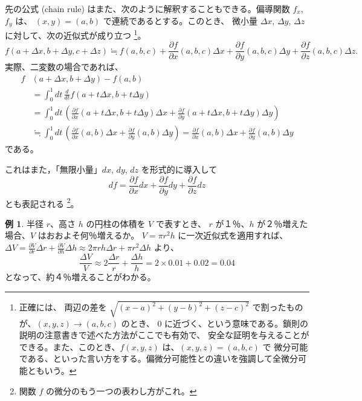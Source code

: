 \documentclass[a4paper]{jsarticle}
\theoremstyle{definition}
\newtheorem{Example}[Theorem]{例}
\theoremstyle{remark}
\newcommand{\del}{\partial}
\begin{document}
\bigskip
{}

先の公式 (chain rule) はまた、次のように解釈することもできる。偏導関数 $f_x$, $f_y$ は、
$(x,y) = (a,b)$ で連続であるとする。このとき、
微小量 $\Delta x$, $\Delta y$, $\Delta z$ に対して、次の近似式が成り立つ
\footnote{正確には、
両辺の差を $\sqrt{(x-a)^2+(y-b)^2+(z-c)^2}$ で割ったものが、$(x,y,z) \to (a,b,c)$ のとき、
$0$ に近づく、という意味である。鎖則の説明の注意書きで述べた方法がここでも有効で、
安全な証明を与えることができる。また、このとき、$f(x,y,z)$ は、$(x,y,z) = (a,b,c)$ で
微分可能である、といった言い方をする。偏微分可能性との違いを強調して全微分可能ともいう。
}。
\[
f(a+\Delta x,b+\Delta y,c+\Delta z) \fallingdotseq f(a,b,c) 
+ \frac{\del f}{\del x}(a,b,c) \Delta x 
+ \frac{\del f}{\del y}(a,b,c) \Delta y 
+ \frac{\del f}{\del z}(a,b,c) \Delta z.  
\]
実際、二変数の場合であれば、
\begin{align*}
f&(a+\Delta x, b + \Delta y) - f(a,b)\\ 
&= \int_0^1 dt\, \frac{d}{dt} f(a+t\Delta x, b + t\Delta y)\\
&= \int_0^1 dt\, 
\left( \frac{\del f}{\del x}(a+t\Delta x,b+t\Delta y) \Delta x 
+ \frac{\del f}{\del y}(a+t\Delta x,b+t\Delta y) \Delta y\right)\\ 
&\fallingdotseq 
\int_0^1 dt\, 
\left( \frac{\del f}{\del x}(a,b) \Delta x 
+ \frac{\del f}{\del y}(a,b) \Delta y\right) 
=  \frac{\del f}{\del x}(a,b) \Delta x 
+ \frac{\del f}{\del y}(a,b) \Delta y
\end{align*}
である。

これはまた，「無限小量」$dx$, $dy$, $dz$ を形式的に導入して
\[
df = \frac{\del f}{\del x} dx + \frac{\del f}{\del y} dy 
+ \frac{\del f}{\del z} dz
\]
とも表記される
\footnote{関数 $f$ の微分のもう一つの表わし方がこれ。}。

\begin{Example}
半径 $r$、高さ $h$ の円柱の体積を $V$ で表すとき、
$r$ が１％、$h$ が２％増えた場合、$V$ はおおよそ何％増えるか。
$V = \pi r^2 h$ に一次近似式を適用すれば、
$\Delta V = \frac{\partial V}{\partial r} \Delta r + \frac{\partial V}{\partial h} \Delta h 
\approx 2\pi rh \Delta r + \pi r^2 \Delta h$ より、
\[ 
\frac{\Delta V}{V} \approx 2\frac{\Delta r}{r} + \frac{\Delta h}{h} = 
2\times 0.01 + 0.02 = 0.04 
\] 
となって、約４％増えることがわかる。
\end{Example}
\end{document}
